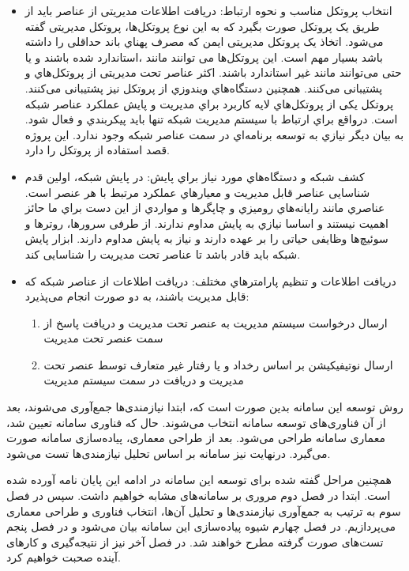 \begin{itemize}
    \item انتخاب پروتکل مناسب و نحوه ارتباط: دریافت اطلاعات مدیریتی از عناصر باید از طریق یک پروتکل صورت بگیرد که به این نوع پروتکل‌ها، پروتکل مدیریتی گفته می‌شود. اتخاذ یک پروتکل مدیریتی ایمن که مصرف پهناي باند حداقلی را داشته باشد بسیار مهم است. این پروتکل‌ها می توانند مانند ،استاندارد شده باشند و یا حتی می‌توانند مانند  غیر استاندارد باشند. اکثر عناصر تحت مدیریتی از پروتکل‌هاي  و   پشتیبانی می‌کنند. همچنین دستگاه‌هاي ویندوزي از پروتکل  نیز پشتیبانی می‌کنند. پروتکل   یکی از پروتکل‌هاي لایه کاربرد  براي مدیریت و پایش عملکرد عناصر شبکه است. درواقع براي ارتباط با سیستم مدیریت شبکه تنها باید پیکربندي و فعال شود. به بیان دیگر نیازي به توسعه برنامه‌اي در سمت عناصر شبکه وجود ندارد. این پروژه قصد استفاده از پروتکل  را دارد.
\newpage
    \item کشف شبکه و دستگاه‌هاي مورد نیاز براي پایش: در پایش شبکه، اولین قدم شناسایی عناصر قابل مدیریت و معیارهاي عملکرد مرتبط با هر عنصر است. عناصري مانند رایانه‌هاي رومیزي و چاپگرها و مواردي از این دست براي ما حائز اهمیت نیستند و اساسا نیازي به پایش مداوم ندارند. از طرفی سرورها، روترها و سوئیچ‌ها وظایفی حیاتی را بر عهده دارند و نیاز به پایش مداوم دارند. ابزار پایش شبکه باید قادر باشد تا عناصر تحت مدیریت را شناسایی کند.
    \item دریافت اطلاعات و تنظیم پارامترهاي مختلف: دریافت اطلاعات از عناصر شبکه که قابل مدیریت باشند، به دو صورت انجام می‌پذیرد:
    \begin{enumerate}
        \item ارسال درخواست سیستم مدیریت به عنصر تحت مدیریت و دریافت پاسخ از سمت عنصر تحت مدیریت
        \item ارسال نوتیفیکیشن بر اساس رخداد و یا رفتار غیر متعارف توسط عنصر تحت مدیریت و دریافت در سمت سیستم مدیریت
    \end{enumerate}
\end{itemize}


روش توسعه این سامانه بدین صورت است که، ابتدا نیازمندی‌ها جمع‌آوری می‌شوند، بعد از آن فناوری‌های توسعه سامانه انتخاب می‌شوند. حال که فناوری سامانه تعیین شد، معماری سامانه طراحی می‌شود. بعد از طراحی معماری، پیاده‌سازی سامانه صورت می‌گیرد. درنهایت نیز سامانه بر اساس تحلیل نیازمندی‌ها تست می‌شود. 

همچنین مراحل گفته شده برای توسعه این سامانه در ادامه این پایان نامه آورده شده است. ابتدا در فصل دوم مروری بر سامانه‌های مشابه خواهیم داشت. سپس در فصل سوم به ترتیب به جمع‌آوری نیازمندی‌ها و تحلیل آن‌ها، انتخاب فناوری و طراحی معماری می‌پردازیم. در فصل چهارم شیوه پیاده‌سازی این سامانه بیان می‌شود و در فصل پنجم تست‌های صورت گرفته مطرح خواهند شد. در فصل آخر نیز از نتیجه‌گیری و کارهای آینده صحبت خواهیم کرد.

